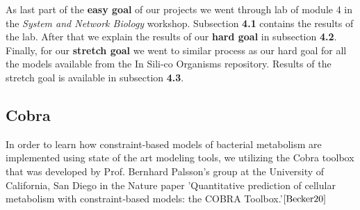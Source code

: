 \documentclass[11pt, a4paper]{article}
\begin{document}
As last part of the \textbf{easy goal} of our projects we went through lab of module 4 in the \textit{System and Network Biology} workshop. Subsection \textbf{4.1} contains the results of the lab. After that we explain the results of our \textbf{hard goal} in subsection \textbf{4.2}. Finally, for our \textbf{stretch goal} we went to similar process as our hard goal for all the models available from the In Sili-co Organisms repository. Results of the stretch goal is available in subsection \textbf{4.3}.
	\subsection{Cobra}
	In order to learn how constraint-based models of bacterial metabolism are implemented using state of the art modeling tools, we utilizing the Cobra toolbox that was developed by Prof. Bernhard Palsson’s group at the University of California, San Diego in the Nature paper 'Quantitative prediction of cellular metabolism with constraint‐based models: the COBRA Toolbox.'$\cite{Becker20}$
\end{document}
